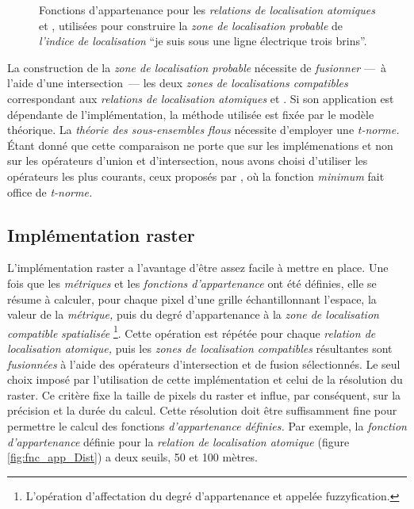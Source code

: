 \begin{figure}
  \centering \subfloat[]{%
    
    \label{fig:fnc_app_Dist}
  }
  \hfill%
  \subfloat[]{%
    
    \label{fig:fnc_app_AltInf}
  }
  \caption{Fonctions d'appartenance pour les \emph{relations de
      localisation atomiques}
    \protect{}
    \protect{} et
    \protect{}
    \protect{}, utilisées pour construire la
    \emph{zone de localisation probable} de \emph{l'indice de
      localisation} \enquote{je suis sous une ligne électrique trois
      brins}.}
  \label{fig:fnc_app_sousProche}
\end{figure}

La construction de la \emph{zone de localisation probable} nécessite
de \emph{fusionner} ---~à l'aide d'une intersection~--- les deux
\emph{zones de localisations compatibles} correspondant aux
\emph{relations de localisation atomiques}
 et
. Si son application est dépendante de
l'implémentation, la méthode utilisée est fixée par le modèle
théorique. La \emph{théorie des sous-ensembles flous} nécessite
d'employer une \emph{t-norme.} Étant donné que cette comparaison ne
porte que sur les implémenations et non sur les opérateurs d'union et
d'intersection, nous avons choisi d'utiliser les opérateurs les plus
courants, ceux proposés par \textcite{Zadeh1965}, où la fonction
\emph{minimum} fait office de \emph{t-norme.}

\subsection{Implémentation raster}

L'implémentation raster a l'avantage d'être assez facile à mettre en
place. Une fois que les \emph{métriques} et les \emph{fonctions
  d’appartenance} ont été définies, elle se résume à calculer, pour
chaque pixel d'une grille échantillonnant l'espace, la valeur de la
\emph{métrique,} puis du degré d'appartenance à la \emph{zone de
  localisation compatible} \emph{spatialisée} \footnote{L'opération
  d'affectation du degré d'appartenance et appelée
  fuzzyfication.}. Cette opération est répétée pour chaque
\emph{relation de localisation atomique,} puis les \emph{zones de
  localisation compatibles} résultantes sont \emph{fusionnées} à
l'aide des opérateurs d'intersection et de fusion sélectionnés. Le
seul choix imposé par l'utilisation de cette implémentation et celui
de la résolution du raster. Ce critère fixe la taille de pixels du
raster et influe, par conséquent, sur la précision et la durée du
calcul. Cette résolution doit être suffisamment fine pour permettre le
calcul des fonctions \emph{d'appartenance définies.} Par exemple, la
\emph{fonction d'appartenance} définie pour la \emph{relation de
  localisation atomique}  (figure
\ref{fig:fnc_app_Dist}) a deux seuils, \num{50} et 100 mètres.

